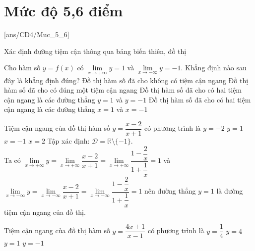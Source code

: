 \section{Mức độ 5,6 điểm}
[ans/CD4/Muc_5_6]
\setcounter{dang}{0}
\setcounter{ex}{0}
\begin{dang}
	{Xác định đường tiệm cận thông qua bảng biến thiên, đồ thị}
\end{dang}
\begin{ex}%
	Cho hàm số $y=f(x)$ có $\lim\limits_{x\rightarrow +\infty}y=1$ và $\lim\limits_{x\rightarrow -\infty}y=-1$. Khẳng định nào sau đây là khẳng định đúng?
	\choice
	{Đồ thị hàm số đã cho không có tiệm cận ngang}
	{Đồ thị hàm số đã cho có đúng một tiệm cận ngang}
	{\True Đồ thị hàm số đã cho có hai tiệm cận ngang là các đường thẳng $y=1$ và $y=-1$}
	{Đồ thị hàm số đã cho có hai tiệm cận ngang là các đường thẳng $x=1$ và $x=-1$}
\end{ex}

\begin{ex}%
	Tiệm cận ngang của đồ thị hàm số $y=\dfrac{x-2}{x+1}$ có phương trình là
	\choice
	{$y=-2$}
	{\True $y=1$}
	{$x=-1$}
	{$x=2$}
	\loigiai
	{
		Tập xác định: $\mathscr{D}=\mathbb{R}\setminus \{-1\}$.\\
		Ta có $\lim \limits_{x \to +\infty} y=\lim \limits_{x \to +\infty} \dfrac{x-2}{x+1}=\lim \limits_{x \to +\infty} \dfrac{1-\dfrac{2}{x}}{1+\dfrac{1}{x}}=1$ và $\lim \limits_{x \to -\infty} y=\lim \limits_{x \to -\infty} \dfrac{x-2}{x+1}=\lim \limits_{x \to -\infty} \dfrac{1-\dfrac{2}{x}}{1+\dfrac{1}{x}}=1$ nên đường thẳng $y=1$ là đường tiệm cận ngang của đồ thị.
	}
\end{ex}

\begin{ex}%
	Tiệm cận ngang của đồ thị hàm số $y=\dfrac{4x+1}{x-1}$ có phương trình là
	\choice
	{$y=\dfrac{1}{4}$}
	{\True $y=4$}
	{$y=1$}
	{$y=-1$}
\end{ex}

